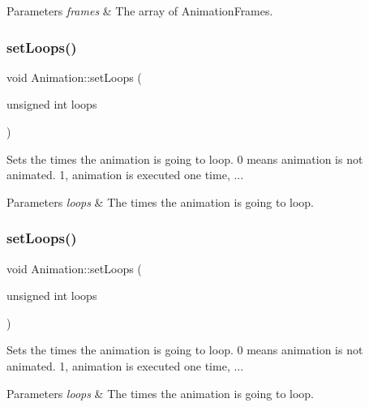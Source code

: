 \begin{DoxyParams}{Parameters}
{\em frames} & The array of Animation\+Frames. \\
\hline
\end{DoxyParams}
\mbox{\label{classAnimation_ae40b12fed5771ac666eb8ef1e4676e17}} 
\subsubsection{\texorpdfstring{set\+Loops()}{setLoops()}\hspace{0.1cm}{\footnotesize\ttfamily [1/2]}}
{\footnotesize\ttfamily void Animation\+::set\+Loops (\begin{DoxyParamCaption}\item[{unsigned int}]{loops }\end{DoxyParamCaption})\hspace{0.3cm}{\ttfamily [inline]}}

Sets the times the animation is going to loop. 0 means animation is not animated. 1, animation is executed one time, ...


\begin{DoxyParams}{Parameters}
{\em loops} & The times the animation is going to loop. \\
\hline
\end{DoxyParams}
\mbox{\label{classAnimation_ae40b12fed5771ac666eb8ef1e4676e17}} 
\subsubsection{\texorpdfstring{set\+Loops()}{setLoops()}\hspace{0.1cm}{\footnotesize\ttfamily [2/2]}}
{\footnotesize\ttfamily void Animation\+::set\+Loops (\begin{DoxyParamCaption}\item[{unsigned int}]{loops }\end{DoxyParamCaption})\hspace{0.3cm}{\ttfamily [inline]}}

Sets the times the animation is going to loop. 0 means animation is not animated. 1, animation is executed one time, ...


\begin{DoxyParams}{Parameters}
{\em loops} & The times the animation is going to loop. \\
\hline
\end{DoxyParams}
\mbox{\label{classAnimation_aeee2ac2f17c63415f5b34c9546824cde}} 
